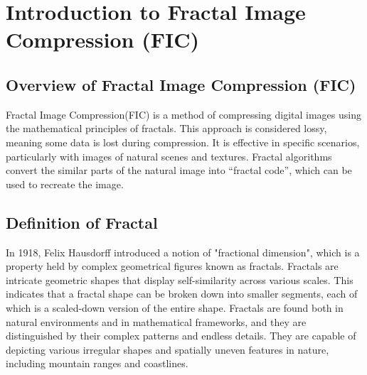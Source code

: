 \documentclass[a4paper,11pt, titlepage]{article}
\theoremstyle{definition}
\theoremstyle{plain}
\theoremstyle{remark}
\theoremstyle{definition}
\begin{document}
\tableofcontents
\clearpage

\section{Introduction to Fractal Image Compression (FIC)}
\label{sec:introduction}

\subsection{Overview of Fractal Image Compression (FIC)}
Fractal Image Compression(FIC) is a method of compressing digital images using the mathematical principles of fractals. This approach is considered lossy, meaning some data is lost during compression. It is effective in specific scenarios, particularly with images of natural scenes and textures. Fractal algorithms convert the similar parts of the natural image into “fractal code”, which can be used to recreate the image.\cite{may1996fractal}

\subsection{Definition of Fractal}
In 1918, Felix Hausdorff introduced a notion of "fractional dimension", which is a property held by complex geometrical figures known as fractals. Fractals are intricate geometric shapes that display self-similarity across various scales. This indicates that a fractal shape can be broken down into smaller segments, each of which is a scaled-down version of the entire shape. Fractals are found both in natural environments and in mathematical frameworks, and they are distinguished by their complex patterns and endless details. They are capable of depicting various irregular shapes and spatially uneven features in nature, including mountain ranges and coastlines.\cite{britannica_fractal}
\end{document}
